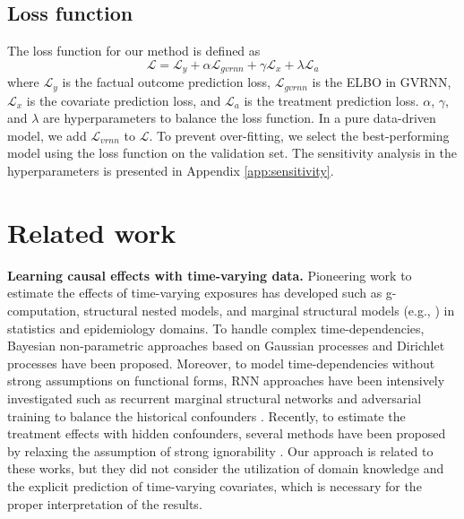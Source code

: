 \documentclass[journal]{IEEEtran}
\begin{document}
\subsection{Loss function}
The loss function for our method is defined as
\begin{equation}
    \mathcal{L} = \mathcal{L}_y + \alpha \mathcal{L}_{gvrnn} + \gamma \mathcal{L}_x + \lambda \mathcal{L}_a %
    \label{eq:loss}
\end{equation}
where $\mathcal{L}_y$ is the factual outcome prediction loss, $\mathcal{L}_{gvrnn}$ is the ELBO in GVRNN, $\mathcal{L}_x$ is the covariate prediction loss, and $\mathcal{L}_a$ is the treatment prediction loss. %
$\alpha$, $\gamma$, and $\lambda$ 
are hyperparameters to balance the loss function. 
In a pure data-driven model, we add $\mathcal{L}_{vrnn}$ to $\mathcal{L}$.
To prevent over-fitting, we select the best-performing model using the loss function on the validation set.
The sensitivity analysis in the hyperparameters is presented in Appendix \ref{app:sensitivity}.



\section{Related work}
\label{sec:related}
\noindent\textbf{Learning causal effects with time-varying data.}
Pioneering work to estimate the effects of time-varying exposures has developed such as 
g-computation, structural nested models, and marginal structural models (e.g., \cite{robins1986new, robins1994correcting, robins2000marginal, robins2009estimation}) in statistics and epidemiology domains. 
To handle complex time-dependencies, Bayesian non-parametric approaches based on Gaussian processes \cite{xu2016bayesian,schulam2017reliable,soleimani2017treatment} and Dirichlet processes \cite{roy2017bayesian} have been proposed. 
Moreover, to model time-dependencies without strong assumptions on functional forms, RNN approaches have been intensively investigated such as recurrent marginal structural networks \cite{lim2018forecasting} and adversarial training to balance the historical confounders \cite{bica2020estimating}. 
Recently, to estimate the treatment effects with hidden confounders, several methods have been proposed by relaxing the assumption of strong ignorability \cite{bica2020time,liu2020estimating,ma2021deconfounding}.
Our approach is related to these works, but they did not consider the utilization of domain knowledge and the explicit prediction of time-varying covariates, which is necessary for the proper interpretation of the results.
\end{document}
